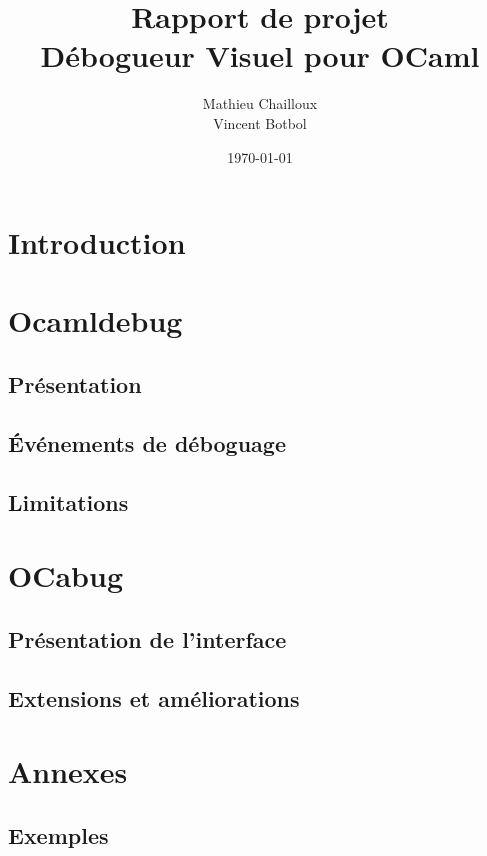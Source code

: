 \documentclass[11pt,a4paper]{report}
\title{Rapport de projet\\Débogueur Visuel pour OCaml}
\author{Mathieu Chailloux\\Vincent Botbol}
\date\today
\begin{document}
\maketitle

\chapter{Introduction}

\chapter{Ocamldebug}

\section{Présentation}
\section{\'Evénements de déboguage}
\section{}
\section{Limitations} %


\chapter{OCabug}

\section{Présentation de l'interface} %
\section{Extensions et améliorations}



\chapter{Annexes}

\section{Exemples}
\end{document}

